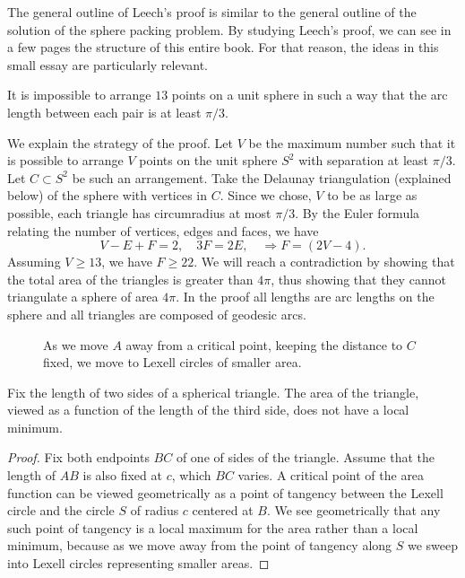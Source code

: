 The general outline of Leech's proof is similar to the general outline of the solution
of the sphere packing problem.  By studying Leech's proof, we can see in a few pages
the structure of this entire book.  For that reason, the ideas in this small essay
are particularly relevant. 

\begin{theorem}  It is impossible to arrange $13$ points on a unit
sphere in such a way that the arc length between each pair is at
least $\pi/3$.
\end{theorem}

We explain the strategy of the proof.  Let $V$ be the maximum
number such that it is possible to arrange $V$ points on the unit
sphere $S^2$ with separation at least $\pi/3$.  Let $C\subset S^2$ be
such an arrangement. Take the Delaunay triangulation (explained below) 
of the sphere with vertices in $C$. Since we chose, $V$ to be as large as
possible, each triangle has circumradius at most $\pi/3$.  By the
Euler formula relating the number of vertices, edges and faces,
we have
    $$V - E + F = 2,\quad 3 F = 2 E,\quad \Rightarrow F =
    (2V-4).$$
Assuming $V\ge 13$, we have $F\ge 22$. 
We will reach a contradiction by showing that
the total area of the triangles is greater than $4\pi$, thus
showing that they cannot triangulate a sphere of area $4\pi$. In
the proof all lengths are arc lengths on the sphere and all
triangles are composed of geodesic arcs.

\begin{figure}[htb]
  \centering
  \caption{As we move $A$ away from a critical
point, keeping the distance to $C$ fixed, we move to Lexell
circles of smaller area.}
  \label{fig:13:A}
\end{figure}



\begin{lemma} Fix the length of two sides of a spherical triangle.
The area of the triangle, viewed as a function of the length of
the third side, does not have a local minimum.
\end{lemma}

\begin{proof}  Fix both endpoints $BC$ of one of sides of the triangle.
Assume that the length of $AB$ is also fixed at $c$, which $BC$
varies. A critical point of the area function can be viewed
geometrically as a point of tangency between the Lexell circle 
and the circle $S$ of radius $c$ centered at $B$.
We see geometrically that any such point of tangency is a local
maximum for the area rather than a local minimum, because as we
move away from the point of tangency along $S$ we sweep into
Lexell circles representing smaller areas.
\end{proof}

